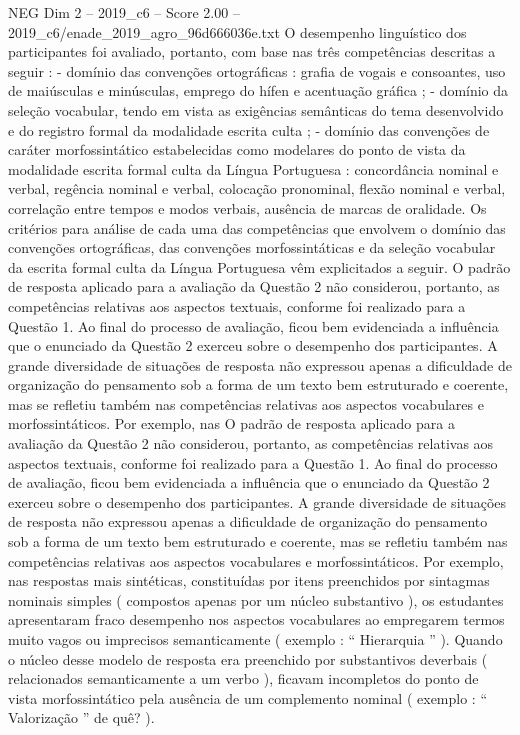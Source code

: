 \begin{textsample}{NEG Dim 2 – 2019\_c6 – Score 2.00 – 2019\_c6/enade\_2019\_agro\_96d666036e.txt}
O desempenho linguístico dos participantes foi avaliado, portanto, com base nas três competências descritas a seguir : - domínio das convenções ortográficas : grafia de vogais e consoantes, uso de maiúsculas e minúsculas, emprego do hífen e acentuação gráfica ; - domínio da seleção vocabular, tendo em vista as exigências semânticas do tema desenvolvido e do registro formal da modalidade escrita culta ; - domínio das convenções de caráter morfossintático estabelecidas como modelares do ponto de vista da modalidade escrita formal culta da Língua Portuguesa : concordância nominal e verbal, regência nominal e verbal, colocação pronominal, flexão nominal e verbal, correlação entre tempos e modos verbais, ausência de marcas de oralidade.
Os critérios para análise de cada uma das competências que envolvem o domínio das convenções ortográficas, das convenções morfossintáticas e da seleção vocabular da escrita formal culta da Língua Portuguesa vêm explicitados a seguir.
O padrão de resposta aplicado para a avaliação da Questão 2 não considerou, portanto, as competências relativas aos aspectos textuais, conforme foi realizado para a Questão 1.
Ao final do processo de avaliação, ficou bem evidenciada a influência que o enunciado da Questão 2 exerceu sobre o desempenho dos participantes.
A grande diversidade de situações de resposta não expressou apenas a dificuldade de organização do pensamento sob a forma de um texto bem estruturado e coerente, mas se refletiu também nas competências relativas aos aspectos vocabulares e morfossintáticos.
Por exemplo, nas O padrão de resposta aplicado para a avaliação da Questão 2 não considerou, portanto, as competências relativas aos aspectos textuais, conforme foi realizado para a Questão 1.
Ao final do processo de avaliação, ficou bem evidenciada a influência que o enunciado da Questão 2 exerceu sobre o desempenho dos participantes.
A grande diversidade de situações de resposta não expressou apenas a dificuldade de organização do pensamento sob a forma de um texto bem estruturado e coerente, mas se refletiu também nas competências relativas aos aspectos vocabulares e morfossintáticos.
Por exemplo, nas respostas mais sintéticas, constituídas por itens preenchidos por sintagmas nominais simples ( compostos apenas por um núcleo substantivo ), os estudantes apresentaram fraco desempenho nos aspectos vocabulares ao empregarem termos muito vagos ou imprecisos semanticamente ( exemplo : “ Hierarquia ” ).
Quando o núcleo desse modelo de resposta era preenchido por substantivos deverbais ( relacionados semanticamente a um verbo ), ficavam incompletos do ponto de vista morfossintático pela ausência de um complemento nominal ( exemplo : “ Valorização ” de quê? ).

\end{textsample}
